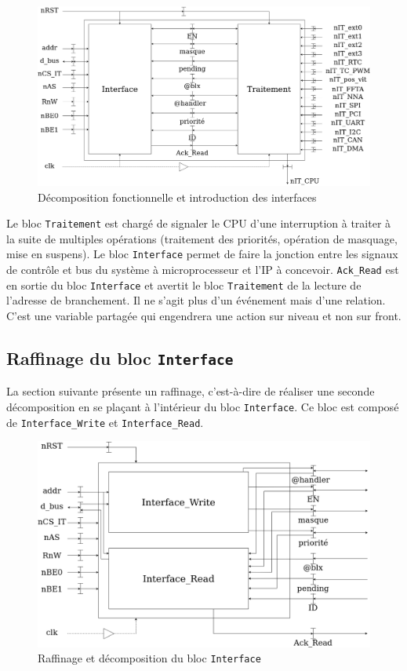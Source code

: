 \begin{figure}[H]
	\centering
	\includegraphics[width=1\linewidth]{figure/decomposition_fonctionnelle.png}
	\caption{Décomposition fonctionnelle et introduction des interfaces}
	\label{fig:decomposition_fonctionnelle}
\end{figure}

Le bloc \texttt{Traitement} est chargé de signaler le CPU d'une interruption à traiter à la suite de multiples opérations (traitement des priorités, opération de masquage, mise en suspens).
Le bloc \texttt{Interface} permet de faire la jonction entre les signaux de contrôle et bus du système à microprocesseur et l'IP à concevoir.
\texttt{Ack\_Read} est en sortie du bloc \texttt{Interface} et avertit le bloc \texttt{Traitement} de la lecture de l'adresse de branchement.
Il ne s'agit plus d'un événement mais d'une relation.
C'est une variable partagée qui engendrera une action sur niveau et non sur front.

\subsection{Raffinage du bloc \texttt{Interface}}

La section suivante présente un raffinage, c'est-à-dire de réaliser une seconde décomposition en se plaçant à l'intérieur du bloc \texttt{Interface}.
Ce bloc est composé de \texttt{Interface\_Write} et \texttt{Interface\_Read}. 

\begin{figure}[H]
	\centering
	\includegraphics[width=1\linewidth]{figure/raffinage_interface.png}
	\caption{Raffinage et décomposition du bloc \texttt{Interface}}
	\label{fig:raffinage_interface}
\end{figure}


